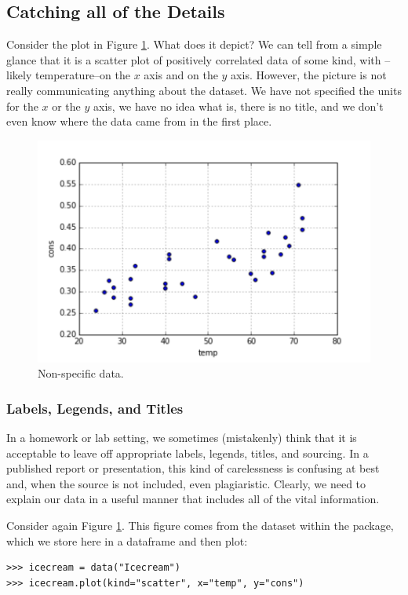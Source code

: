 \subsection*{Catching all of the Details}

Consider the plot in Figure \ref{fig:nolabels}.
What does it depict?
We can tell from a simple glance that it is a scatter plot of positively correlated data of some kind, with --likely temperature--on the $x$ axis and  on the $y$ axis.
However, the picture is not really communicating anything about the dataset. We have not specified the units for the $x$ or the $y$ axis, we have no idea what  is, there is no title, and we don't even know where the data came from in the first place.

\begin{figure}[H]
    \centering
    \includegraphics[width=.75\textwidth]{Nolabels.pdf}
    \caption{Non-specific data.}
    \label{fig:nolabels}
\end{figure}

\subsubsection*{Labels, Legends, and Titles}
In a homework or lab setting, we sometimes (mistakenly) think that it is acceptable to leave off appropriate labels, legends, titles, and sourcing.
In a published report or presentation, this kind of carelessness is confusing at best and, when the source is not included, even plagiaristic.
Clearly, we need to explain our data in a useful manner that includes all of the vital information.

Consider again Figure \ref{fig:nolabels}.
This figure comes from the  dataset within the  package, which we store here in a dataframe and then plot:
\begin{lstlisting}
>>> icecream = data("Icecream")
>>> icecream.plot(kind="scatter", x="temp", y="cons")
\end{lstlisting}

